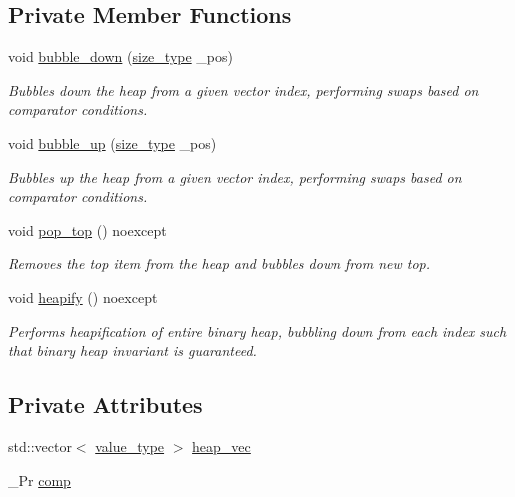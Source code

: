 \subsection*{Private Member Functions}
\begin{DoxyCompactItemize}
\item 
void \hyperlink{classcrsc_1_1priority__queue_a0eeef0c2e3ac88be9f9e5f77ec7b71cc}{bubble\+\_\+down} (\hyperlink{classcrsc_1_1priority__queue_a2b1c9a55084026111d70a4fe869e0fbe}{size\+\_\+type} \+\_\+pos)
\begin{DoxyCompactList}\small\item\em Bubbles down the heap from a given vector index, performing swaps based on comparator conditions. \end{DoxyCompactList}\item 
void \hyperlink{classcrsc_1_1priority__queue_a39f493e04737a79c673cc29a94c165cc}{bubble\+\_\+up} (\hyperlink{classcrsc_1_1priority__queue_a2b1c9a55084026111d70a4fe869e0fbe}{size\+\_\+type} \+\_\+pos)
\begin{DoxyCompactList}\small\item\em Bubbles up the heap from a given vector index, performing swaps based on comparator conditions. \end{DoxyCompactList}\item 
void \hyperlink{classcrsc_1_1priority__queue_ad4793f4fd1e74671fd147a1aa0308933}{pop\+\_\+top} () noexcept
\begin{DoxyCompactList}\small\item\em Removes the top item from the heap and bubbles down from new top. \end{DoxyCompactList}\item 
void \hyperlink{classcrsc_1_1priority__queue_a0ff3f63750679149c557ac30f8775a96}{heapify} () noexcept
\begin{DoxyCompactList}\small\item\em Performs heapification of entire binary heap, bubbling down from each index such that binary heap invariant is guaranteed. \end{DoxyCompactList}\end{DoxyCompactItemize}
\subsection*{Private Attributes}
\begin{DoxyCompactItemize}
\item 
std\+::vector$<$ \hyperlink{classcrsc_1_1priority__queue_a2a7d77c9465b6c918f67021e6eb926d7}{value\+\_\+type} $>$ \hyperlink{classcrsc_1_1priority__queue_ab21e7fd1647424d3580e86dc0aec2597}{heap\+\_\+vec}
\item 
\+\_\+\+Pr \hyperlink{classcrsc_1_1priority__queue_aeb39fce3f1ec0299540cf5431ca4129e}{comp}
\end{DoxyCompactItemize}


